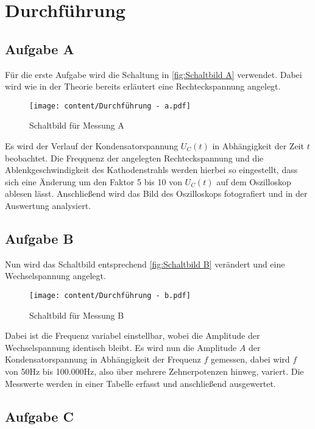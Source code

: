 \section{Durchführung}
\label{sec:Durchführung}

\subsection{Aufgabe A}

Für die erste Aufgabe wird die Schaltung in \autoref{fig:Schaltbild A} verwendet.
Dabei wird wie in der Theorie bereits erläutert eine Rechteckspannung angelegt.

\begin{figure}
    \centering
    \texttt{[image: content/Durchführung - a.pdf]}
    \caption{Schaltbild für Messung A \cite{v353}}
    \label{fig:Schaltbild A}
\end{figure}


Es wird der Verlauf der Kondensatorspannung $U_{C}(t)$ in Abhängigkeit der Zeit $t$ beobachtet.
Die Freqquenz der angelegten Rechteckspannung und die Ablenkgeschwindigkeit des Kathodenstrahls werden hierbei so eingestellt,
dass sich eine Änderung um den Faktor 5 bis 10 von $U_{C}(t)$ auf dem Oszilloskop ablesen lässt.
Anschließend wird das Bild des Oszilloskops fotografiert und in der Auswertung analysiert.

\subsection{Aufgabe B}

Nun wird das Schaltbild entsprechend  \autoref{fig:Schaltbild B} verändert und eine Wechselspannung angelegt.

\begin{figure}%
    \centering
    \texttt{[image: content/Durchführung - b.pdf]}
    \caption{Schaltbild für Messung B \cite{v353}}
    \label{fig:Schaltbild B}
\end{figure}

Dabei ist die Frequenz variabel einstellbar, wobei die Amplitude der Wechselspannung identisch bleibt.
Es wird nun die Amplitude $A$ der Kondensatorspannung in Abhängigkeit der Frequenz $f$ gemessen,
dabei wird $f$ von 50Hz bis 100.000Hz, also über mehrere Zehnerpotenzen hinweg, variert.
Die Messwerte werden in einer Tabelle erfasst und anschließend ausgewertet.

\subsection{Aufgabe C}

